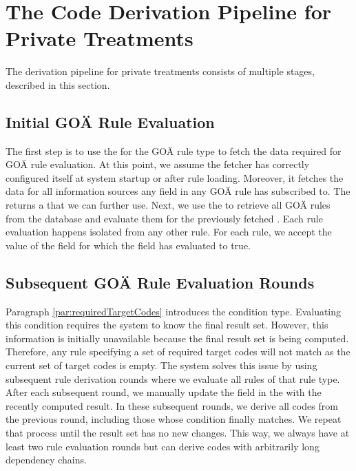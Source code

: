 \section{The Code Derivation Pipeline for Private Treatments}\label{sec:the-code-derivation-pipeline-for-private-treatments}
The derivation pipeline for private treatments consists of multiple stages, described in this section.

\subsection{Initial GOÄ Rule Evaluation}\label{subsec:initial-goä-rule-evalutation}
The first step is to use the \REIF for the GOÄ rule type to fetch the data required for GOÄ rule evaluation.
At this point,
we assume the fetcher has correctly configured itself at system startup or after rule loading.
Moreover, it fetches the data for all information sources any field in any GOÄ rule has subscribed to.
The \REIF returns a \REI that we can further use.
Next, we use the  to retrieve all GOÄ rules from the database and evaluate them for the previously fetched \REI.
Each rule evaluation happens isolated from any other rule.
For each rule, we accept the value of the  field for which the  field has evaluated to true.

\subsection{Subsequent GOÄ Rule Evaluation Rounds}\label{subsec:susequent-goä-rule-evaluation-rounds}
Paragraph \ref{par:requiredTargetCodes} introduces the \requiredTargetCodes condition type.
Evaluating this condition requires the system to know the final result set.
However, this information is initially unavailable because the final result set is being computed.
Therefore, any rule specifying a set of required target codes will not match as the current set of target codes is empty.
The system solves this issue by using subsequent rule derivation rounds where we evaluate all rules of that rule type.
After each subsequent round, we manually update the  field in the \REI with the recently computed result.
In these subsequent rounds, we derive all codes from the previous round, including those whose \requiredTargetCodes condition finally matches.
We repeat that process until the result set has no new changes.
This way, we always have at least two rule evaluation rounds
but can derive codes with arbitrarily long \requiredTargetCodes dependency chains.

